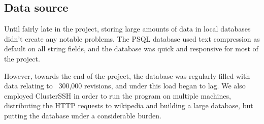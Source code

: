 \subsection{Data source}

Until fairly late in the project, storing large amounts of data in
local databases didn't create any notable problems. The PSQL database
used text compression as default on all string fields,\cite{psql-comp}
and the database was quick and responsive for most of the project.

However, towards the end of the project, the database was regularly
filled with data relating to ~300,000 revisions, and under this load
began to lag. We also employed ClusterSSH in order to run the program
on multiple machines,\cite{clusterssh} distributing the HTTP requests
to wikipedia and building a large database, but putting the database
under a considerable burden.

